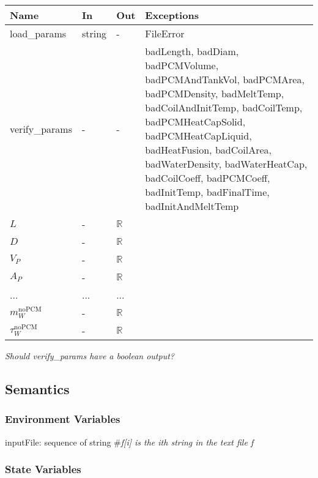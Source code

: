 \documentclass[12pt]{article}
\begin{document}
\begin{tabular}{p{3cm} p{1cm} p{1cm} >{\raggedright\arraybackslash}p{9cm}}
\toprule
\textbf{Name} & \textbf{In} & \textbf{Out} & \textbf{Exceptions} \\
\midrule
load\_params & string & - &  FileError \\
verify\_params & - & - & badLength, badDiam, badPCMVolume, badPCMAndTankVol,
                        badPCMArea, badPCMDensity, badMeltTemp,
                        badCoilAndInitTemp, badCoilTemp, badPCMHeatCapSolid,
                        badPCMHeatCapLiquid, badHeatFusion, badCoilArea,
                        badWaterDensity, badWaterHeatCap, badCoilCoeff,
                        badPCMCoeff, badInitTemp, badFinalTime,
                        badInitAndMeltTemp \\
$L$ & - & $\mathbb{R}$\\
$D$ & - & $\mathbb{R}$\\
$V_P$ & - & $\mathbb{R}$\\
$A_P$ & - & $\mathbb{R}$\\
... & ... & ...\\
$m_W^{\text{noPCM}}$ & - & $\mathbb{R}$ \\
$\tau_W^{\text{noPCM}}$ & - & $\mathbb{R}$\\
\bottomrule
\end{tabular}

\textit{Should verify\_params have a boolean output?}

\subsection{Semantics}

\subsubsection{Environment Variables}

inputFile: sequence of string \#\textit{f[i] is the ith string in the text file f}\\ 

\subsubsection{State Variables}
\end{document}
